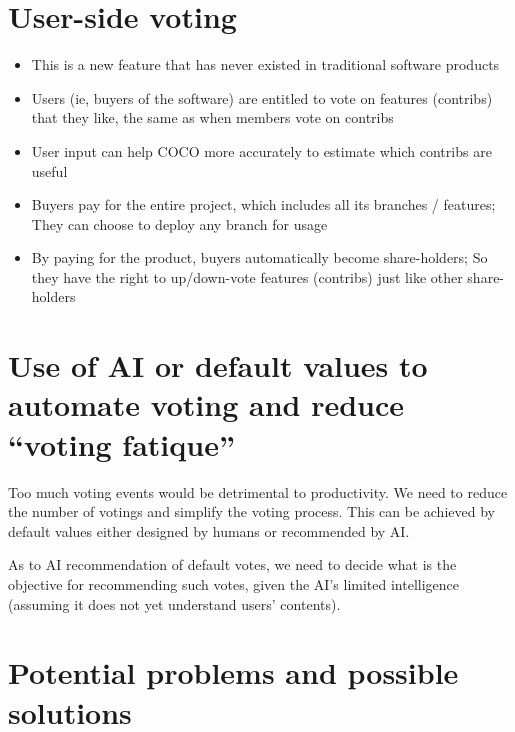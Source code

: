 \documentclass[12pt, orivec]{article}
\begin{document}
\secttoc
\section{User-side voting}

\begin{itemize}
	\item This is a new feature that has never existed in traditional software products
	
	\item Users (ie, buyers of the software) are entitled to vote on features (contribs) that they like, the same as when members vote on contribs
	
	\item User input can help COCO more accurately to estimate which contribs are useful

	\item Buyers pay for the entire project, which includes all its branches / features;  They can choose to deploy any branch for usage

	\item By paying for the product, buyers automatically become share-holders;  So they have the right to up/down-vote features (contribs) just like other share-holders
\end{itemize}

\secttoc
\section{Use of AI or default values to automate voting and reduce ``voting fatique''}

Too much voting events would be detrimental to productivity.  We need to reduce the number of votings and simplify the voting process.  This can be achieved by default values either designed by humans or recommended by AI.

As to AI recommendation of default votes, we need to decide what is the objective for recommending such votes, given the AI's limited intelligence (assuming it does not yet understand users' contents).

\secttoc
\section{Potential problems and possible solutions}
\end{document}
